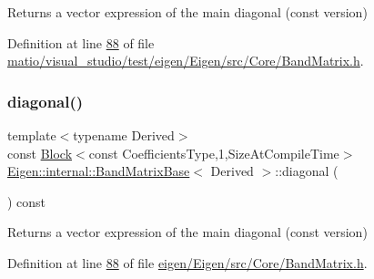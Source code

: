 \begin{DoxyReturn}{Returns}
a vector expression of the main diagonal (const version) 
\end{DoxyReturn}


Definition at line \hyperlink{matio_2visual__studio_2test_2eigen_2_eigen_2src_2_core_2_band_matrix_8h_source_l00088}{88} of file \hyperlink{matio_2visual__studio_2test_2eigen_2_eigen_2src_2_core_2_band_matrix_8h_source}{matio/visual\+\_\+studio/test/eigen/\+Eigen/src/\+Core/\+Band\+Matrix.\+h}.

\mbox{\label{class_eigen_1_1internal_1_1_band_matrix_base_a7c55438da88b00d29f8f514bddfa86ba}} 
\subsubsection{\texorpdfstring{diagonal()}{diagonal()}\hspace{0.1cm}{\footnotesize\ttfamily [4/12]}}
{\footnotesize\ttfamily template$<$typename Derived$>$ \\
const \hyperlink{group___core___module_class_eigen_1_1_block}{Block}$<$const Coefficients\+Type,1,Size\+At\+Compile\+Time$>$ \hyperlink{class_eigen_1_1internal_1_1_band_matrix_base}{Eigen\+::internal\+::\+Band\+Matrix\+Base}$<$ Derived $>$\+::diagonal (\begin{DoxyParamCaption}{ }\end{DoxyParamCaption}) const\hspace{0.3cm}{\ttfamily [inline]}}

\begin{DoxyReturn}{Returns}
a vector expression of the main diagonal (const version) 
\end{DoxyReturn}


Definition at line \hyperlink{eigen_2_eigen_2src_2_core_2_band_matrix_8h_source_l00088}{88} of file \hyperlink{eigen_2_eigen_2src_2_core_2_band_matrix_8h_source}{eigen/\+Eigen/src/\+Core/\+Band\+Matrix.\+h}.

\mbox{\label{class_eigen_1_1internal_1_1_band_matrix_base_a1d98143681d5c1e2709ce18332a939dc}} 
